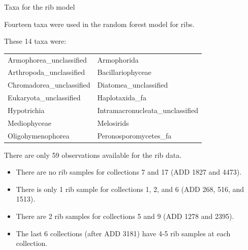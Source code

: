 \documentclass{beamer}
\begin{document}
\begin{frame}{Taxa for the rib model}

  {\footnotesize
    
  \noindent  Fourteen taxa were used in the random forest model for ribs.
  
  \vspace{0.1in}

  \noindent These 14 taxa were:
  
  \vspace{0.05in}

  \begin{tabular}{ll}
    Armophorea\_unclassified & Armophorida\\
    Arthropoda\_unclassified & Bacillariophyceae\\
    Chromadorea\_unclassified & Diatomea\_unclassified\\
    Eukaryota\_unclassified &  Haplotaxida\_fa\\
    Hypotrichia & Intramacronucleata\_unclassified\\
    Mediophyceae & Melosirids\\
    Oligohymenophorea & Peronosporomycetes\_fa          
  \end{tabular}

  \vspace{0.2in}
  \noindent There are only 59 observations available for the rib data.
  \begin{itemize}
    \item There are no rib samples for collections 7 and 17 (ADD 1827 and 4473).
    \item There is only 1 rib sample for collections 1, 2, and 6 (ADD 268, 516,
    and 1513).
    \item There are 2 rib samples for collections 5 and 9 (ADD 1278 and 2395).
    \item The last 6 collections (after ADD 3181) have 4-5 rib samples at each
    collection.
  \end{itemize}
  }

\end{frame}
\end{document}
